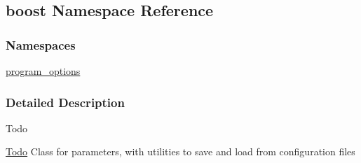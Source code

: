 \hypertarget{namespaceboost}{\subsection{boost Namespace Reference}
\label{namespaceboost}
}
\subsubsection*{Namespaces}
\begin{DoxyCompactItemize}
\item 
\hyperlink{namespaceboost_1_1program__options}{program\-\_\-options}
\end{DoxyCompactItemize}


\subsubsection{Detailed Description}
\begin{DoxyRefDesc}{Todo}
\item[\hyperlink{todo__todo000003}{Todo}]Class for parameters, with utilities to save and load from configuration files \end{DoxyRefDesc}
